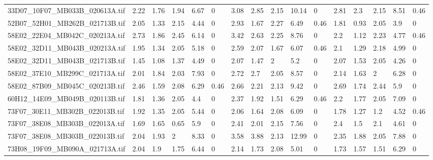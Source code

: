 \begin{tabular}{llllllllllllllll}
 33D07\_10F07\_MB033B\_020613A.tif & 2.22                              & 1.76    & 1.94   & 6.67  & 0    & 3.08    & 2.85    & 2.15   & 10.14 & 0    & 2.81     & 2.3     & 2.15   & 8.51 & 0.46 \\
 52B07\_52H01\_MB262B\_021713B.tif & 2.05                              & 1.33    & 2.15   & 4.44  & 0    & 2.93    & 1.67    & 2.27   & 6.49  & 0.46 & 1.81     & 0.93    & 2.05   & 3.9  & 0    \\
 58E02\_22E04\_MB042C\_020213A.tif & 2.73                              & 1.86    & 2.45   & 6.14  & 0    & 3.42    & 2.63    & 2.25   & 8.76  & 0    & 2.2      & 1.12    & 2.23   & 4.77 & 0.46 \\
 58E02\_32D11\_MB043B\_020213A.tif & 1.95                              & 1.34    & 2.05   & 5.18  & 0    & 2.59    & 2.07    & 1.67   & 6.07  & 0.46 & 2.1      & 1.29    & 2.18   & 4.99 & 0    \\
 58E02\_32D11\_MB043B\_021713B.tif & 1.45                              & 1.08    & 1.37   & 4.49  & 0    & 2.07    & 1.47    & 2      & 5.2   & 0    & 2.07     & 1.53    & 2.05   & 4.26 & 0    \\
 58E02\_37E10\_MB299C\_021713A.tif & 2.01                              & 1.84    & 2.03   & 7.93  & 0    & 2.72    & 2.7     & 2.05   & 8.57  & 0    & 2.14     & 1.63    & 2      & 6.28 & 0    \\
 58E02\_87B09\_MB045C\_020213B.tif & 2.46                              & 1.59    & 2.08   & 6.29  & 0.46 & 2.66    & 2.21    & 2.13   & 9.42  & 0    & 2.69     & 1.74    & 2.44   & 5.9  & 0    \\
 60H12\_14E09\_MB049B\_020113B.tif & 1.81                              & 1.36    & 2.05   & 4.4   & 0    & 2.37    & 1.92    & 1.51   & 6.29  & 0.46 & 2.2      & 1.77    & 2.05   & 7.09 & 0    \\
 73F07\_30E11\_MB302B\_022013B.tif & 1.92                              & 1.35    & 2.05   & 5.44  & 0    & 2.06    & 1.64    & 2.08   & 6.09  & 0    & 1.78     & 1.27    & 1.2    & 4.52 & 0.46 \\
 73F07\_38E08\_MB303B\_022013A.tif & 1.69                              & 1.65    & 0.65   & 5.9   & 0    & 2.41    & 2.01    & 2.15   & 7.56  & 0    & 2.4      & 1.5     & 2.1    & 4.61 & 0    \\
 73F07\_38E08\_MB303B\_022013B.tif & 2.04                              & 1.93    & 2      & 8.33  & 0    & 3.58    & 3.88    & 2.13   & 12.99 & 0    & 2.35     & 1.88    & 2.05   & 7.88 & 0    \\
 73H08\_19F09\_MB090A\_021713A.tif & 2.04                              & 1.9     & 1.75   & 6.44  & 0    & 2.14    & 1.73    & 2.08   & 5.01  & 0    & 1.73     & 1.57    & 1.51   & 6.29 & 0    \\

\end{tabular}
